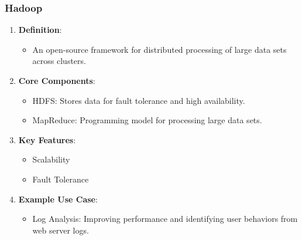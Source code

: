 \documentclass[aspectratio=169]{beamer}
\begin{document}
\begin{frame}[fragile]
    \frametitle{Hadoop}
    \begin{enumerate}
        \item \textbf{Definition}:
        \begin{itemize}
            \item An open-source framework for distributed processing of large data sets across clusters.
        \end{itemize}
        
        \item \textbf{Core Components}:
        \begin{itemize}
            \item HDFS: Stores data for fault tolerance and high availability.
            \item MapReduce: Programming model for processing large data sets.
        \end{itemize}
        
        \item \textbf{Key Features}:
        \begin{itemize}
            \item Scalability
            \item Fault Tolerance
        \end{itemize}
        
        \item \textbf{Example Use Case}:
        \begin{itemize}
            \item Log Analysis: Improving performance and identifying user behaviors from web server logs.
        \end{itemize}
    \end{enumerate}
\end{frame}
\end{document}
